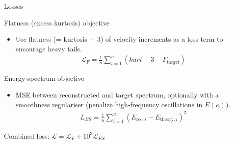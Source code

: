 \documentclass[11pt]{beamer}
\begin{document}
\begin{frame}{Losses}
  \begin{block}{Flatness (excess kurtosis) objective}
    \begin{itemize}
      \item Use flatness (= kurtosis $-$ 3) of velocity increments as a loss term to encourage heavy tails.
      \begin{align}
        \mathcal{L}_F = \frac{1}{n}\sum_{i=1}^{n}(kurt-3-F_\text{target})
      \end{align}
    \end{itemize}
  \end{block}
  \begin{block}{Energy-spectrum objective}
    \begin{itemize}
      \item MSE between reconstructed and target spectrum, optionally with a smoothness regulariser (penalize high-frequency oscillations in $E(\kappa)$).
      \begin{align}
        L_{ES} = \frac{1}{n}\sum_{i=1}^{n}(E_{\text{rec},i}-E_{\text{theory},i})^2
      \end{align}
    \end{itemize}
  \end{block}
  \vfill
  \centering Combined loss: $\mathcal{L}=\mathcal{L}_F + 10^3\mathcal{L}_{ES}$
\end{frame}
\end{document}
